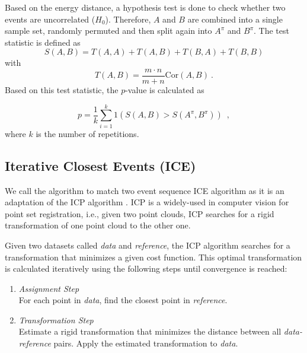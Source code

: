 \documentclass[conference]{IEEEtran}
\theoremstyle{examplestyle}
\begin{document}
Based on the energy distance, a hypothesis test is done to check whether two events are uncorrelated (\(H_0\)). Therefore, \(A\) and \(B\) are combined into a single sample set, randomly permuted and then split again into \(A^\pi\) and \(B^\pi\). The test statistic is defined as
\begin{equation}
	S(A, B) = T(A, A) + T(A, B) + T(B, A) + T(B, B)
\end{equation}
with
\begin{equation*}
	T(A, B) = \dfrac{m \cdot n}{m + n} \text{Cor}(A, B) ~.
\end{equation*}
Based on this test statistic, the \(p\)-value is calculated as

\begin{equation}
	p = \dfrac{1}{k} \sum_{i = 1}^k 1 \left( S(A, B) > S(A^\pi , B^\pi) \right) \enspace, 
\end{equation}
where \(k\) is the number of repetitions.



\subsection{Iterative Closest Events (ICE)}
\label{sec:ice}

We call the algorithm to match two event sequence \acf{ICE} algorithm as it is an adaptation of the \acf{ICP} algorithm \cite{Besl1992}. \ac{ICP} is a widely-used in computer vision for point set registration, i.e., given two point clouds, \ac{ICP} searches for a rigid transformation of one point cloud to the other one. 

Given two datasets called \textit{data} and \textit{reference}, the \ac{ICP} algorithm searches for a transformation that minimizes a given cost function. This optimal transformation is calculated iteratively using the following steps \cite{Besl1992} until convergence is reached:

\begin{enumerate}
	\item \emph{Assignment Step}\\ 
	For each point in \textit{data}, find the closest point in \textit{reference}.
	\item \emph{Transformation Step}\\ Estimate a rigid transformation that minimizes the distance between all \textit{data-reference} pairs. Apply the estimated transformation to \textit{data}.
\end{enumerate}
\end{document}
